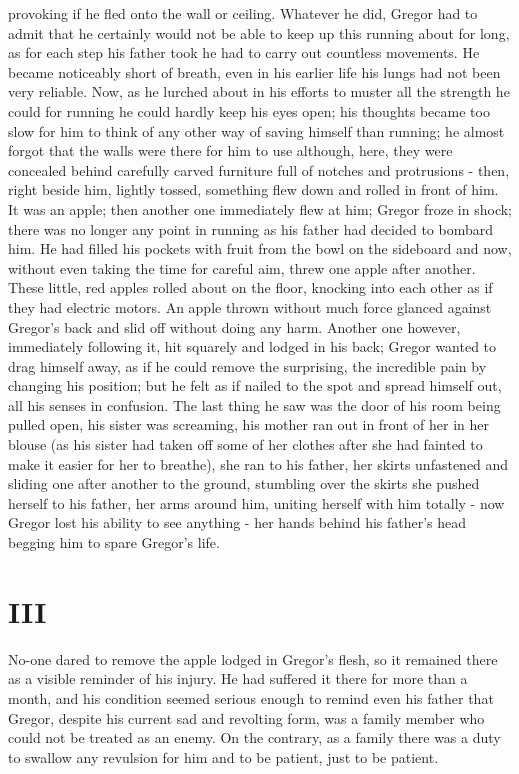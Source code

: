 \documentclass[12pt]{report}
\newcommand{\mychapter}[2]{
\setcounter{chapter}{#1}
    \setcounter{section}{0}
    \chapter*{#2}
    \addcontentsline{toc}{chapter}{#2}
}
\begin{document}
provoking if he fled onto the wall or ceiling. Whatever he did, Gregor
had to admit that he certainly would not be able to keep up this running
about for long, as for each step his father took he had to carry out
countless movements. He became noticeably short of breath, even in his
earlier life his lungs had not been very reliable. Now, as he lurched
about in his efforts to muster all the strength he could for running he
could hardly keep his eyes open; his thoughts became too slow for him to
think of any other way of saving himself than running; he almost forgot
that the walls were there for him to use although, here, they were
concealed behind carefully carved furniture full of notches and
protrusions - then, right beside him, lightly tossed, something flew
down and rolled in front of him. It was an apple; then another one
immediately flew at him; Gregor froze in shock; there was no longer any
point in running as his father had decided to bombard him. He had filled
his pockets with fruit from the bowl on the sideboard and now, without
even taking the time for careful aim, threw one apple after another.
These little, red apples rolled about on the floor, knocking into each
other as if they had electric motors. An apple thrown without much force
glanced against Gregor's back and slid off without doing any harm.
Another one however, immediately following it, hit squarely and lodged
in his back; Gregor wanted to drag himself away, as if he could remove
the surprising, the incredible pain by changing his position; but he
felt as if nailed to the spot and spread himself out, all his senses in
confusion. The last thing he saw was the door of his room being pulled
open, his sister was screaming, his mother ran out in front of her in
her blouse (as his sister had taken off some of her clothes after she
had fainted to make it easier for her to breathe), she ran to his
father, her skirts unfastened and sliding one after another to the
ground, stumbling over the skirts she pushed herself to his father, her
arms around him, uniting herself with him totally - now Gregor lost his
ability to see anything - her hands behind his father's head begging him
to spare Gregor's life.

\mychapter{3}{III}\label{iii}

No-one dared to remove the apple lodged in Gregor's flesh, so it
remained there as a visible reminder of his injury. He had suffered it
there for more than a month, and his condition seemed serious enough to
remind even his father that Gregor, despite his current sad and
revolting form, was a family member who could not be treated as an
enemy. On the contrary, as a family there was a duty to swallow any
revulsion for him and to be patient, just to be patient.
\end{document}
